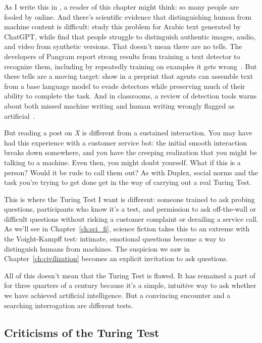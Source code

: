 As I write this in \currentyear{}, a reader of this chapter might think:
so many people are fooled by  online.
%
And there's scientific
evidence that distinguishing human from machine content is difficult:
\citet{boutadjine-25} study this problem for Arabic text generated by
ChatGPT, while \citet{cooke-25} find that people struggle to distinguish
authentic images, audio, and video from synthetic versions.
%
That doesn't mean there are no tells.  The developers of Pangram report
strong results from training a text detector to recognize them,
including by repeatedly training on examples it gets
wrong~\citep{emi-24-pangram,emi-25-pangram}.
%
But these tells are a moving target: \citet{dhingra-26} show in a preprint
that agents can assemble text from a base language model to evade
detectors while preserving much of their ability to complete the task.
%
And in classrooms, a review of detection tools warns about both missed
machine writing and human writing wrongly flagged as
artificial~\citep{deep-25}.

But reading a post on \textit{X} is different from a sustained interaction.
%
You may have had this experience with a customer service bot: the initial
smooth interaction breaks down somewhere, and you have the creeping
realization that you might be talking to a machine.
%
Even then, you might doubt yourself.  What if this is a person?  Would it
be rude to call them out?
%
As with Duplex, social norms and the task you're trying to get done get
in the way of carrying out a real Turing Test.

This is where the Turing Test I want is different: someone trained to
ask probing questions, participants who know it's a test, and permission
to ask off-the-wall or difficult questions without risking a customer
complaint or derailing a service call.
%
As we'll see in Chapter~\ref{ch:sci_fi}, science fiction takes this to an
extreme with the Voight-Kampff test: intimate, emotional questions become
a way to distinguish humans from machines.
%
The suspicion we saw in Chapter~\ref{ch:civilization} becomes an explicit
invitation to ask questions.

All of this doesn't mean that the Turing Test is flawed.  It has
remained a part of  for three quarters of a century because it's a
simple, intuitive way to ask whether we have achieved artificial
intelligence.  But a convincing encounter and a searching interrogation
are different tests.


\subsection{Criticisms of the Turing Test}
\label{sec:turing:criticism}

